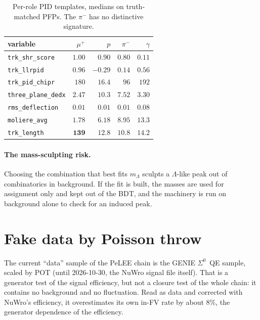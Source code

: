 \documentclass[11pt,a4paper]{article}
\newcommand{\Szero}{\ensuremath{\Sigma^{0}}}
\newcommand{\Lam}{\ensuremath{\Lambda}}
\begin{document}
\begin{table}[h]\centering\small
\begin{tabular}{lrrrr}
\toprule
variable & $\mu^+$ & $p$ & $\pi^-$ & $\gamma$ \\
\midrule
\texttt{trk\_shr\_score}    & $1.00$  & $0.90$  & $0.80$  & $\mathbf{0.11}$ \\
\texttt{trk\_llrpid}        & $\mathbf{0.96}$ & $-0.29$ & $0.14$ & $0.56$ \\
\texttt{trk\_pid\_chipr}    & $180$   & $\mathbf{16.4}$ & $96$ & $192$ \\
\texttt{three\_plane\_dedx} & $2.47$  & $\mathbf{10.3}$ & $7.52$ & $3.30$ \\
\texttt{rms\_deflection}    & $0.01$  & $0.01$  & $0.01$  & $\mathbf{0.08}$ \\
\texttt{moliere\_avg}       & $1.78$  & $6.18$  & $8.95$  & $\mathbf{13.3}$ \\
\texttt{trk\_length}        & $\mathbf{139}$ & $12.8$ & $10.8$ & $14.2$ \\
\bottomrule
\end{tabular}
\caption{Per-role PID templates, medians on truth-matched PFPs. The $\pi^-$ has no
distinctive signature.}
\label{tab:templates}
\end{table}

\paragraph{The mass-sculpting risk.} Choosing the combination that best fits $m_\Lam$
sculpts a \Lam-like peak out of combinatorics in background. If the fit is built, the
masses are used for assignment only and kept out of the BDT, and the machinery is run on
background alone to check for an induced peak.

\section{Fake data by Poisson throw}
\label{sec:fakedata}

The current ``data'' sample of the PeLEE chain is the GENIE \Szero\ QE sample, scaled
by POT (until 2026-10-30, the NuWro signal file itself). That is a generator test of
the signal efficiency, but not a closure test of the whole chain: it contains no
background and no fluctuation. Read as data and corrected with NuWro's efficiency, it
overestimates its own in-FV rate by about $8\%$, the generator dependence of the
efficiency.
\end{document}
